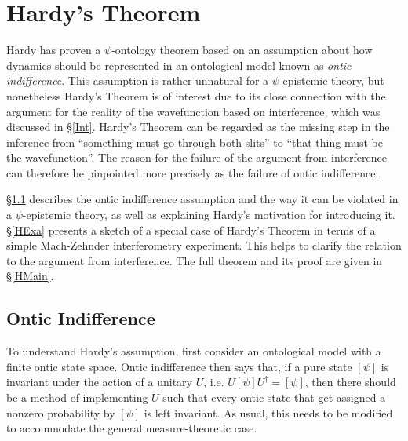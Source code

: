 \documentclass[DIV=calc,paper=a4,fontsize=11pt,twocolumn]{scrartcl} %
\theoremstyle{definition}
\theoremstyle{plain}
\newcommand{\Proj}[1]{\ensuremath{\left [ #1 \right ]}}
\begin{document}
\section{Hardy's Theorem}

\label{Hardy}

Hardy has proven a $\psi$-ontology theorem \cite{Hardy2013} based on
an assumption about how dynamics should be represented in an
ontological model known as \emph{ontic indifference}.  This assumption
is rather unnatural for a $\psi$-epistemic theory, but nonetheless
Hardy's Theorem is of interest due to its close connection with the
argument for the reality of the wavefunction based on interference,
which was discussed in \S\ref{Int}.  Hardy's Theorem can be regarded
as the missing step in the inference from ``something must go through
both slits'' to ``that thing must be the wavefunction''.  The reason
for the failure of the argument from interference can therefore be
pinpointed more precisely as the failure of ontic indifference.

\S\ref{OI} describes the ontic indifference assumption and the way it
can be violated in a $\psi$-epistemic theory, as well as explaining
Hardy's motivation for introducing it.  \S\ref{HExa} presents a sketch
of a special case of Hardy's Theorem in terms of a simple Mach-Zehnder
interferometry experiment.  This helps to clarify the relation to the
argument from interference.  The full theorem and its proof are given
in \S\ref{HMain}.

\subsection{Ontic Indifference}

\label{OI}

To understand Hardy's assumption, first consider an ontological model
with a finite ontic state space.  Ontic indifference then says that,
if a pure state $\Proj{\psi}$ is invariant under the action of a
unitary $U$, i.e. $U \Proj{\psi} U^{\dagger} = \Proj{\psi}$, then
there should be a method of implementing $U$ such that every ontic
state that get assigned a nonzero probability by $\Proj{\psi}$ is
left invariant.  As usual, this needs to be modified to accommodate
the general measure-theoretic case.
\end{document}
